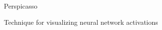 \documentclass[12pt,letterpaper]{article}
\begin{document}
\sloppy
\vspace*{\fill}
\begin{center}\Large%
Perspicasso\\
\end{center}
\vspace*{\fill}
\newpage


Technique for visualizing neural network activations\cite{samek2015evaluating}

\newpage


\end{document}
